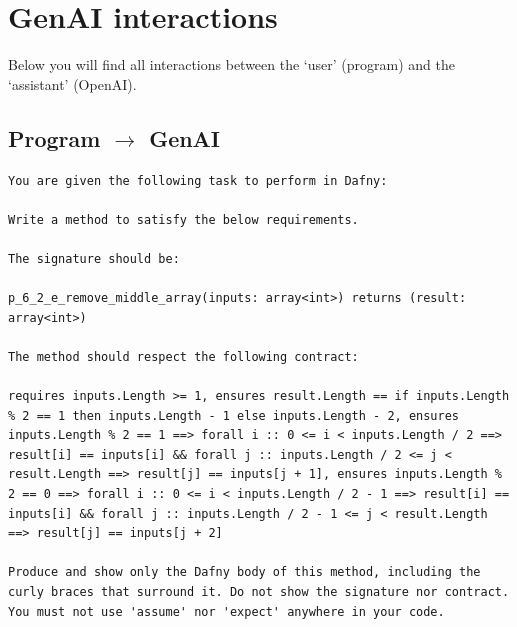 \documentclass{article}
\begin{document}
\section*{GenAI interactions}
Below you will find all interactions between the `user' (program) and the `assistant' (OpenAI).
\subsection*{Program $\rightarrow$ GenAI}
\begin{lstlisting}
You are given the following task to perform in Dafny:

Write a method to satisfy the below requirements.

The signature should be:

p_6_2_e_remove_middle_array(inputs: array<int>) returns (result: array<int>)

The method should respect the following contract:

requires inputs.Length >= 1, ensures result.Length == if inputs.Length % 2 == 1 then inputs.Length - 1 else inputs.Length - 2, ensures inputs.Length % 2 == 1 ==> forall i :: 0 <= i < inputs.Length / 2 ==> result[i] == inputs[i] && forall j :: inputs.Length / 2 <= j < result.Length ==> result[j] == inputs[j + 1], ensures inputs.Length % 2 == 0 ==> forall i :: 0 <= i < inputs.Length / 2 - 1 ==> result[i] == inputs[i] && forall j :: inputs.Length / 2 - 1 <= j < result.Length ==> result[j] == inputs[j + 2]

Produce and show only the Dafny body of this method, including the curly braces that surround it. Do not show the signature nor contract. You must not use 'assume' nor 'expect' anywhere in your code.
\end{lstlisting}
\end{document}
